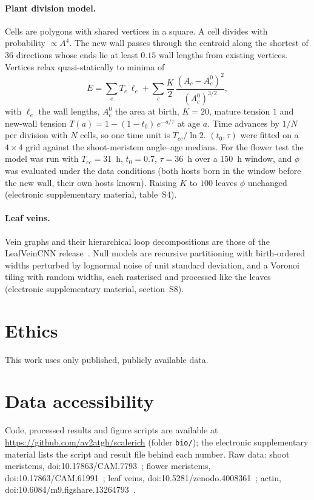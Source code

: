 \documentclass[11pt,a4paper]{article}
\begin{document}
\paragraph{Plant division model.} Cells are polygons with shared vertices in a square. A
cell divides with probability $\propto A^4$. The new wall passes through the centroid along
the shortest of 36 directions whose ends lie at least $0.15$ wall lengths from existing
vertices. Vertices relax quasi-statically to minima of
\begin{equation}
E=\sum_{e}T_e\,\ell_e+\sum_{c}\frac{K}{2}\,\frac{(A_c-A_c^0)^2}{(A_c^0)^{3/2}},
\end{equation}
with $\ell_e$ the wall lengths, $A_c^0$ the area at birth, $K=20$, mature tension $1$ and
new-wall tension $T(a)=1-(1-t_0)\,e^{-a/\tau}$ at age $a$. Time advances by $1/N$ per
division with $N$ cells, so one time unit is $T_{cc}/\ln2$. $(t_0,\tau)$ were fitted on a
$4\times4$ grid against the shoot-meristem angle--age medians. For the flower test the model
was run with $T_{cc}=31$~h, $t_0=0.7$, $\tau=36$~h over a $150$~h window, and $\phi$ was
evaluated under the data conditions (both hosts born in the window before the new wall,
their own hosts known). Raising $K$ to $100$ leaves $\phi$ unchanged (electronic supplementary material, table~S4).

\paragraph{Leaf veins.} Vein graphs and their hierarchical loop decompositions are those of
the LeafVeinCNN release~\cite{xu2021}. Null models are recursive partitioning with birth-ordered widths
perturbed by lognormal noise of unit standard deviation, and a Voronoi tiling with random
widths, each rasterised and processed like the leaves (electronic supplementary material,
section~S8).

\section*{Ethics}
This work uses only published, publicly available data.

\section*{Data accessibility}
Code, processed results and figure scripts are available at
\url{https://github.com/av2atgh/scalerich} (folder \texttt{bio/}); the electronic
supplementary material lists the script and result file behind each number. Raw data:
shoot meristems, doi:10.17863/CAM.7793~\cite{willis2016}; flower meristems,
doi:10.17863/CAM.61991~\cite{refahi2021}; leaf veins, doi:10.5281/zenodo.4008361~\cite{xu2021};
actin, doi:10.6084/m9.figshare.13264793~\cite{qiao2021}.
\end{document}
